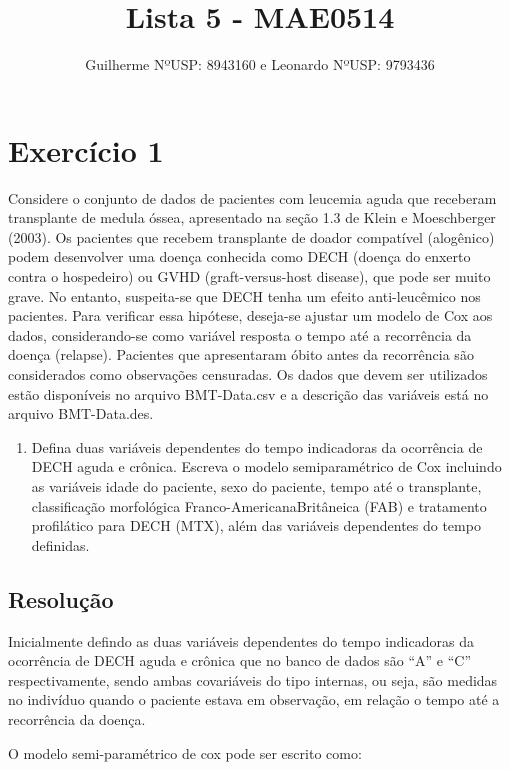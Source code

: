 \documentclass[]{article}
\title{Lista 5 - MAE0514}
\author{Guilherme NºUSP: 8943160 e Leonardo NºUSP: 9793436}
\date{}
\providecommand{\tightlist}{%
  \setlength{\itemsep}{0pt}\setlength{\parskip}{0pt}}
\begin{document}
\maketitle

\section{Exercício 1}\label{exercicio-1}

Considere o conjunto de dados de pacientes com leucemia aguda que
receberam transplante de medula óssea, apresentado na seção 1.3 de Klein
e Moeschberger (2003). Os pacientes que recebem transplante de doador
compatível (alogênico) podem desenvolver uma doença conhecida como DECH
(doença do enxerto contra o hospedeiro) ou GVHD (graft-versus-host
disease), que pode ser muito grave. No entanto, suspeita-se que DECH
tenha um efeito anti-leucêmico nos pacientes. Para verificar essa
hipótese, deseja-se ajustar um modelo de Cox aos dados, considerando-se
como variável resposta o tempo até a recorrência da doença (relapse).
Pacientes que apresentaram óbito antes da recorrência são considerados
como observações censuradas. Os dados que devem ser utilizados estão
disponíveis no arquivo BMT-Data.csv e a descrição das variáveis está no
arquivo BMT-Data.des.

\begin{enumerate}
\def\labelenumi{(\alph{enumi})}
\tightlist
\item
  Defina duas variáveis dependentes do tempo indicadoras da ocorrência
  de DECH aguda e crônica. Escreva o modelo semiparamétrico de Cox
  incluindo as variáveis idade do paciente, sexo do paciente, tempo até
  o transplante, classificação morfológica Franco-AmericanaBritâneica
  (FAB) e tratamento profilático para DECH (MTX), além das variáveis
  dependentes do tempo definidas.
\end{enumerate}

\subsection{Resolução}\label{resolucao}

Inicialmente defindo as duas variáveis dependentes do tempo indicadoras
da ocorrência de DECH aguda e crônica que no banco de dados são ``A'' e
``C'' respectivamente, sendo ambas covariáveis do tipo internas, ou
seja, são medidas no indivíduo quando o paciente estava em observação,
em relação o tempo até a recorrência da doença.

O modelo semi-paramétrico de cox pode ser escrito como:
\end{document}
